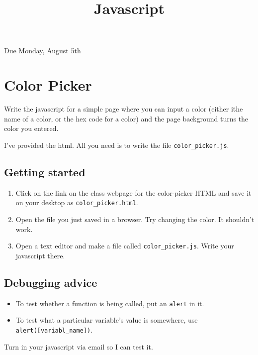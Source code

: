 \documentclass{article}
\title{Javascript}
\begin{document}
\maketitle

Due Monday, August 5th

\section{Color Picker}
Write the javascript for a simple page where you can input a color (either ithe name of a color, or the hex code for a color) and the page background turns the color you entered.


I've provided the html.  All you need is to write the file \texttt{color\_picker.js}.


\subsection*{Getting started}
\begin{enumerate}
\item Click on the link on the class webpage for the color-picker HTML
and save it on your desktop as \texttt{color\_picker.html}.
\item Open the file you just saved in a browser.  Try changing the color.  It shouldn't work.
\item Open a text editor and make a file called \texttt{color\_picker.js}.  Write your javascript there.
\end{enumerate}


\subsection*{Debugging advice}
\begin{itemize}
\item To test whether a function is being called, put an \texttt{alert} in it.
\item To test what a particular variable's value is somewhere, use \texttt{alert([variabl\_name])}.
\end{itemize}

Turn in your javascript via email so I can test it.
\end{document}
